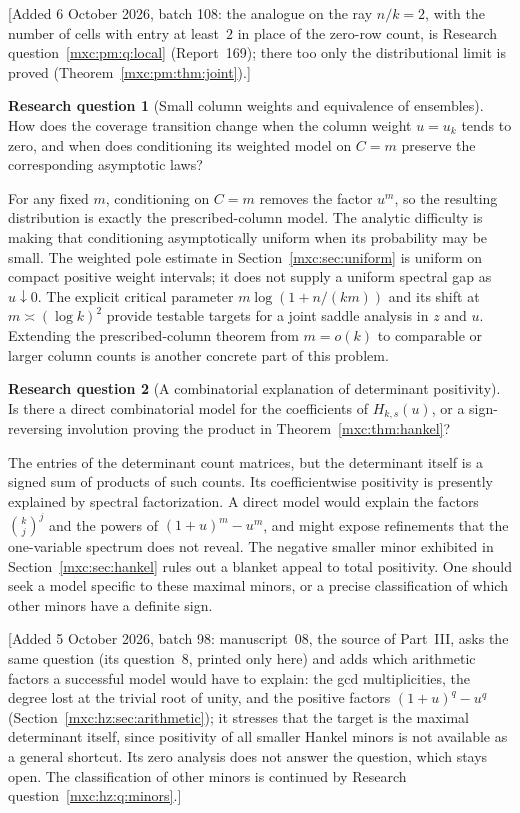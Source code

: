 \documentclass[11pt]{article}
\numberwithin{equation}{section}
\theoremstyle{definition}
\newtheorem{question}{Research question}
\theoremstyle{remark}
\begin{document}
[Added 6 October 2026, batch 108: the analogue on the ray $n/k=2$, with the
number of cells with entry at least~$2$ in place of the zero-row count, is
Research question~\ref{mxc:pm:q:local} (Report~169); there too only the
distributional limit is proved (Theorem~\ref{mxc:pm:thm:joint}).]

\begin{question}[Small column weights and equivalence of ensembles]
How does the coverage transition change when the column weight
$u=u_k$ tends to zero, and when does conditioning its weighted model on
$C=m$ preserve the corresponding asymptotic laws?
\end{question}

For any fixed $m$, conditioning on $C=m$ removes the factor $u^m$, so
the resulting distribution is exactly the prescribed-column model.
The analytic difficulty is making that conditioning asymptotically
uniform when its probability may be small. The weighted pole estimate
in Section~\ref{mxc:sec:uniform} is uniform on compact positive weight
intervals; it does not supply a uniform spectral gap as $u\downarrow0$.
The explicit critical parameter
$m\log(1+n/(km))$ and its shift at $m\asymp(\log k)^2$ provide testable
targets for a joint saddle analysis in $z$ and $u$. Extending the
prescribed-column theorem from $m=o(k)$ to comparable or larger column
counts is another concrete part of this problem.

\begin{question}[A combinatorial explanation of determinant positivity]
Is there a direct combinatorial model for the coefficients of
$H_{k,s}(u)$, or a sign-reversing involution proving the product in
Theorem~\ref{mxc:thm:hankel}?
\end{question}

The entries of the determinant count matrices, but the determinant
itself is a signed sum of products of such counts. Its coefficientwise
positivity is presently explained by spectral factorization. A direct
model would explain the factors $\binom{k}{j}^{j}$ and the powers of
$(1+u)^m-u^m$, and might expose refinements that the one-variable
spectrum does not reveal. The negative smaller minor exhibited in
Section~\ref{mxc:sec:hankel} rules out a blanket appeal to total positivity.
One should seek a model specific to these maximal minors, or a precise
classification of which other minors have a definite sign.

[Added 5 October 2026, batch 98: manuscript~08, the source of Part~III,
asks the same question (its question~8, printed only here) and adds which
arithmetic factors a successful model would have to explain: the gcd
multiplicities, the degree lost at the trivial root of unity, and the
positive factors $(1+u)^q-u^q$
(Section~\ref{mxc:hz:sec:arithmetic}); it stresses that the target is the
maximal determinant itself, since positivity of all smaller Hankel minors is
not available as a general shortcut. Its zero analysis does not answer the
question, which stays open. The classification of other minors is continued
by Research question~\ref{mxc:hz:q:minors}.]
\end{document}
